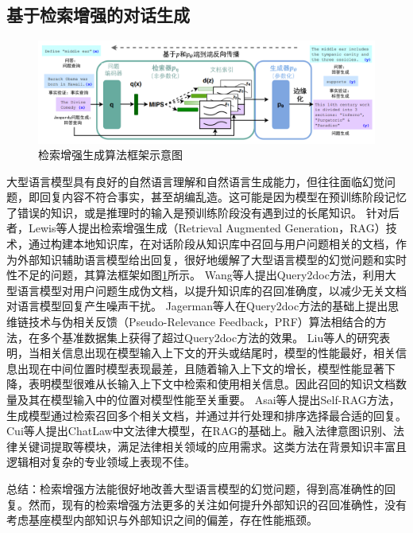 \subsection{基于检索增强的对话生成}

\begin{figure}[htbp]
	\centering
	\includegraphics[scale=0.48]{Fig/meta_rag_framework.png}
	\caption{\label{meta_rag_framework}检索增强生成算法框架示意图\cite{DBLP:conf/nips/LewisPPPKGKLYR020}}
\end{figure}

大型语言模型具有良好的自然语言理解和自然语言生成能力，但往往面临幻觉问题，即回复内容不符合事实，甚至胡编乱造。这可能是因为模型在预训练阶段记忆了错误的知识，或是推理时的输入是预训练阶段没有遇到过的长尾知识。
针对后者，Lewis等人\cite{DBLP:conf/nips/LewisPPPKGKLYR020}提出检索增强生成（Retrieval Augmented Generation，RAG）技术，通过构建本地知识库，在对话阶段从知识库中召回与用户问题相关的文档，作为外部知识辅助语言模型给出回复，很好地缓解了大型语言模型的幻觉问题和实时性不足的问题，其算法框架如图\ref{meta_rag_framework}所示。
Wang等人\cite{DBLP:conf/emnlp/WangYW23}提出Query2doc方法，利用大型语言模型对用户问题生成伪文档，以提升知识库的召回准确度，以减少无关文档对语言模型回复产生噪声干扰。
Jagerman等人\cite{DBLP:journals/corr/abs-2305-03653}在Query2doc方法的基础上提出思维链技术与伪相关反馈（Pseudo-Relevance Feedback，PRF）算法相结合的方法，在多个基准数据集上获得了超过Query2doc方法的效果。
Liu等人\cite{DBLP:journals/corr/abs-2307-03172}的研究表明，当相关信息出现在模型输入上下文的开头或结尾时，模型的性能最好，相关信息出现在中间位置时模型表现最差，且随着输入上下文的增长，模型性能显著下降，表明模型很难从长输入上下文中检索和使用相关信息。因此召回的知识文档数量及其在模型输入中的位置对模型性能至关重要。
Asai等人\cite{DBLP:journals/corr/abs-2310-11511}提出Self-RAG方法，生成模型通过检索召回多个相关文档，并通过并行处理和排序选择最合适的回复。
Cui等人\cite{DBLP:journals/corr/abs-2306-16092}提出ChatLaw中文法律大模型，在RAG的基础上。融入法律意图识别、法律关键词提取等模块，满足法律相关领域的应用需求。这类方法在背景知识丰富且逻辑相对复杂的专业领域上表现不佳。

总结：检索增强方法能很好地改善大型语言模型的幻觉问题，得到高准确性的回复。然而，现有的检索增强方法更多的关注如何提升外部知识的召回准确性，没有考虑基座模型内部知识与外部知识之间的偏差，存在性能瓶颈。

